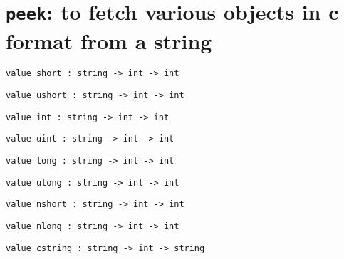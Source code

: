 \section{{\tt peek}:  to fetch various objects in c format from a string}

%

\begin{comment}
 Arguments: a string and an offset into that string.
   Result: as follows. 
\end{comment}
\begin{verbatim}
value short : string -> int -> int
\end{verbatim}
%
\begin{comment}
 A signed short 
\end{comment}
\begin{verbatim}
value ushort : string -> int -> int
\end{verbatim}
%
\begin{comment}
 An unsigned short 
\end{comment}
\begin{verbatim}
value int : string -> int -> int
\end{verbatim}
%
\begin{comment}
 A signed int 
\end{comment}
\begin{verbatim}
value uint : string -> int -> int
\end{verbatim}
%
\begin{comment}
 An unsigned int 
\end{comment}
\begin{verbatim}
value long : string -> int -> int
\end{verbatim}
%
\begin{comment}
 A signed long (currenty truncated to 31 bits) 
\end{comment}
\begin{verbatim}
value ulong : string -> int -> int
\end{verbatim}
%
\begin{comment}
 An unsigned long (currently trucated to 31 bits) 
\end{comment}
\begin{verbatim}
value nshort : string -> int -> int
\end{verbatim}
%
\begin{comment}
 An unsigned short in network byte order 
\end{comment}
\begin{verbatim}
value nlong : string -> int -> int
\end{verbatim}
%
\begin{comment}
 An unsigned long in network byte order 
\end{comment}
\begin{verbatim}
value cstring : string -> int -> string
\end{verbatim}
%
\begin{comment}
 A null-terminated string 
\end{comment}
